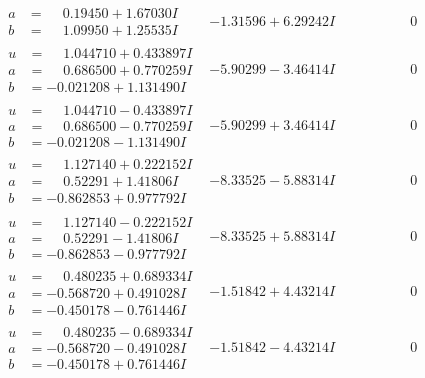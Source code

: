 \documentclass[1p]{elsarticle_modified}
\theoremstyle{definition}
\begin{document}
$$\begin{array}{c|c|c}
\begin{aligned}
a &= \phantom{-}0.19450 + 1.67030 I \\
b &= \phantom{-}1.09950 + 1.25535 I\end{aligned}
 & -1.31596 + 6.29242 I & \phantom{-0.000000 } 0 \\ \hline\begin{aligned}
u &= \phantom{-}1.044710 + 0.433897 I \\
a &= \phantom{-}0.686500 + 0.770259 I \\
b &= -0.021208 + 1.131490 I\end{aligned}
 & -5.90299 - 3.46414 I & \phantom{-0.000000 } 0 \\ \hline\begin{aligned}
u &= \phantom{-}1.044710 - 0.433897 I \\
a &= \phantom{-}0.686500 - 0.770259 I \\
b &= -0.021208 - 1.131490 I\end{aligned}
 & -5.90299 + 3.46414 I & \phantom{-0.000000 } 0 \\ \hline\begin{aligned}
u &= \phantom{-}1.127140 + 0.222152 I \\
a &= \phantom{-}0.52291 + 1.41806 I \\
b &= -0.862853 + 0.977792 I\end{aligned}
 & -8.33525 - 5.88314 I & \phantom{-0.000000 } 0 \\ \hline\begin{aligned}
u &= \phantom{-}1.127140 - 0.222152 I \\
a &= \phantom{-}0.52291 - 1.41806 I \\
b &= -0.862853 - 0.977792 I\end{aligned}
 & -8.33525 + 5.88314 I & \phantom{-0.000000 } 0 \\ \hline\begin{aligned}
u &= \phantom{-}0.480235 + 0.689334 I \\
a &= -0.568720 + 0.491028 I \\
b &= -0.450178 - 0.761446 I\end{aligned}
 & -1.51842 + 4.43214 I & \phantom{-0.000000 } 0 \\ \hline\begin{aligned}
u &= \phantom{-}0.480235 - 0.689334 I \\
a &= -0.568720 - 0.491028 I \\
b &= -0.450178 + 0.761446 I\end{aligned}
 & -1.51842 - 4.43214 I & \phantom{-0.000000 } 0 \\ \hline\begin{aligned}

\end{aligned}
\end{array}$$
\end{document}
